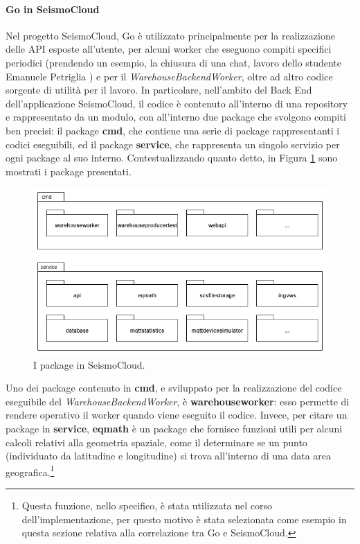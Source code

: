 \paragraph{Go in SeismoCloud} 
Nel progetto SeismoCloud, Go è utilizzato principalmente per la realizzazione delle API esposte all'utente, per alcuni worker che eseguono compiti specifici periodici (prendendo un esempio, la chiusura di una chat, lavoro dello studente Emanuele Petriglia \cite{emanuelepetriglia}) e per il \textit{WarehouseBackendWorker}, oltre ad altro codice sorgente di utilità per il lavoro.
In particolare, nell'ambito del Back End dell'applicazione SeismoCloud, il codice è contenuto all'interno di una repository e rappresentato da un modulo, con all'interno due package che svolgono compiti ben precisi: il package \textbf{cmd}, che contiene una serie di package rappresentanti i codici eseguibili, ed il package \textbf{service}, che rappresenta un singolo servizio per ogni package al suo interno. Contestualizzando quanto detto, in Figura \ref{fig:seismopackage} sono mostrati i package presentati.
\begin{figure}[h!]
    \centering
    \includegraphics[width=\textwidth]{images/seismopackage.jpg}
    \caption{I package in SeismoCloud.}
    \label{fig:seismopackage}
\end{figure}
Uno dei package contenuto in \textbf{cmd}, e sviluppato per la realizzazione del codice eseguibile del \textit{WarehouseBackendWorker}, è \textbf{warehouseworker}: esso permette di rendere operativo il worker quando viene eseguito il codice. Invece, per citare un package in \textbf{service}, \textbf{eqmath} è un package che fornisce funzioni utili per alcuni calcoli relativi alla geometria spaziale, come il determinare se un punto (individuato da latitudine e longitudine) si trova all'interno di una data area geografica.\footnote{Questa funzione, nello specifico, è stata utilizzata nel corso dell'implementazione, per questo motivo è stata selezionata come esempio in questa sezione relativa alla correlazione tra Go e SeismoCloud.}

